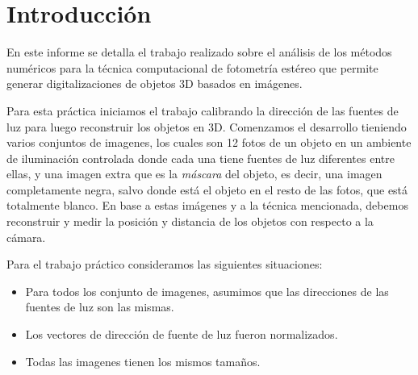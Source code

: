 \section{Introducción}

En este informe se detalla el trabajo realizado sobre el análisis de los métodos numéricos para la técnica computacional de fotometría estéreo que permite generar digitalizaciones de objetos 3D basados en imágenes.

Para esta práctica iniciamos el trabajo calibrando la dirección de las fuentes de luz para luego reconstruir los objetos en 3D. Comenzamos el desarrollo tieniendo varios conjuntos de imagenes, los cuales son 12 fotos de un objeto en un ambiente de iluminación controlada donde cada una tiene fuentes de luz diferentes entre ellas, y una imagen extra que es la \textit{máscara} del objeto, es decir, una imagen completamente negra, salvo donde está el objeto en el resto de las fotos, que está totalmente blanco. En base a estas imágenes y a la técnica mencionada, debemos reconstruir y medir la posición y distancia de los objetos con respecto a la cámara.

Para el trabajo práctico consideramos las siguientes situaciones:
\begin{itemize}
  \item Para todos los conjunto de imagenes, asumimos que las direcciones de las fuentes de luz son las mismas.
  \item Los vectores de dirección de fuente de luz fueron normalizados.
  \item Todas las imagenes tienen los mismos tamaños.
\end{itemize}